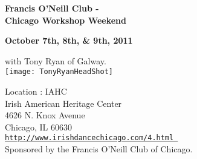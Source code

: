 \vspace{0pt}
\begin{center}
{\Large\textbf{Francis O'Neill Club -\\ Chicago Workshop Weekend}}\\ 
\end{center}

\begin{center}
\textbf{October 7th, 8th, \&  9th, 2011}\\ 
\end{center}

\vspace*{0.25em}
with Tony Ryan of Galway.\\

\vspace*{0.5em}
\texttt{[image: TonyRyanHeadShot]}

\vspace*{0.5em}
Location : IAHC\\
Irish American Heritage Center\\
4626 N. Knox Avenue\\
Chicago, IL  60630 \\

\href{http://www.irishdancechicago.com/4.html}{\tt http://www.irishdancechicago.com/4.html } \\

{\small Sponsored by the Francis O'Neill Club of Chicago.}
